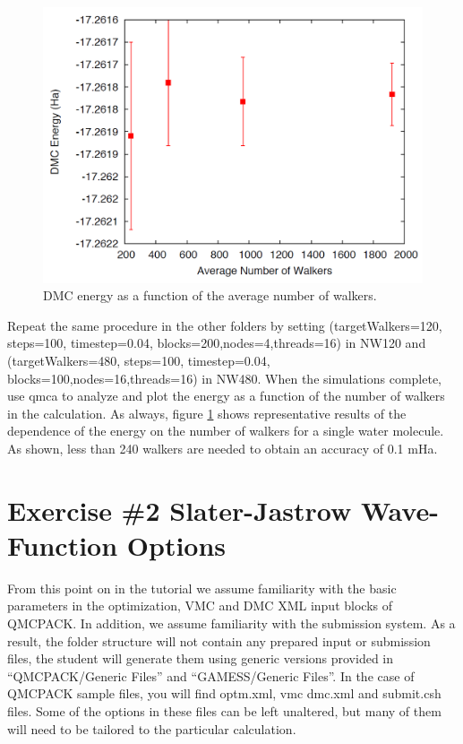 \begin{figure}
\begin{center}
\includegraphics[trim = 0mm 0mm 0mm 0mm, clip,width=0.75\columnwidth]{./figures/lab_advanced_molecules_dmc_popcont}
\end{center}
\caption{DMC energy as a function of the average number of walkers.
\label{fig:lam_dmc_popcont}
}
\end{figure}

Repeat the same procedure in the other folders by setting (targetWalkers=120,
steps=100, timestep=0.04, blocks=200,nodes=4,threads=16) in NW120 and (targetWalkers=480, 
steps=100, timestep=0.04, blocks=100,nodes=16,threads=16) in NW480. When
the simulations complete, use qmca to analyze and plot the energy as a function of the
number of walkers in the calculation. As always, figure \ref{fig:lam_dmc_popcont} 
shows representative results of the
dependence of the energy on the number of walkers for a single water molecule. As shown,
less than 240 walkers are needed to obtain an accuracy of 0.1 mHa.


\section{Exercise \#2 Slater-Jastrow Wave-Function Options}
From this point on in the tutorial we assume familiarity with the basic parameters in the
optimization, VMC and DMC XML input blocks of QMCPACK. In addition, we assume
familiarity with the submission system. As a result, the folder structure will not contain
any prepared input or submission files, the student will generate them using generic versions
provided in ``QMCPACK/Generic Files'' and ``GAMESS/Generic Files''. In the case of QMCPACK sample 
files, you will find optm.xml, vmc dmc.xml and submit.csh files. Some of
the options in these files can be left unaltered, but many of them will need to be tailored to
the particular calculation.

